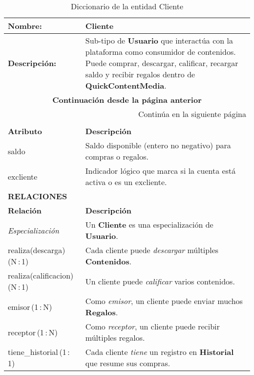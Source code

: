 \renewcommand{\arraystretch}{1.3}
\begin{longtable}{|p{3.5cm}|p{10cm}|}
\caption{Diccionario de la entidad Cliente}
\label{tab:diccionarioCliente} \\ 
\hline
\textbf{Nombre:} & Cliente \\
\hline
\textbf{Descripción:} & 
Sub-tipo de \textbf{Usuario} que interactúa con la plataforma como
consumidor de contenidos.  Puede comprar, descargar, calificar,
recargar saldo y recibir regalos dentro de
\textbf{QuickContentMedia}. \\ \hline
\endfirsthead

\multicolumn{2}{c}{\textbf{Continuación desde la página anterior}} \\ 
\endhead

\hline \multicolumn{2}{r}{{Continúa en la siguiente página}} \\ 
\endfoot

\hline
\endlastfoot

\multicolumn{2}{|p{13.5cm}|}{\textbf{ATRIBUTOS}} \\ \hline
\textbf{Atributo} & \textbf{Descripción} \\ \hline
saldo       & Saldo disponible (entero no negativo) para compras o regalos. \\ \hline
excliente   & Indicador lógico que marca si la cuenta está activa o es un excliente. \\ \hline

\multicolumn{2}{|p{13.5cm}|}{\textbf{RELACIONES}} \\ \hline
\textbf{Relación} & \textbf{Descripción} \\ \hline
\textit{Especialización} & Un \textbf{Cliente} es una especialización de \textbf{Usuario}. \\ \hline
realiza(descarga)\,(N\,:\,1) & Cada cliente puede \emph{descargar} múltiples \textbf{Contenidos}. \\ \hline
realiza(calificacion)\,(N\,:\,1) & Un cliente puede \emph{calificar} varios contenidos. \\ \hline
emisor\,(1\,:\,N) & Como \textit{emisor}, un cliente puede enviar muchos \textbf{Regalos}. \\ \hline
receptor\,(1\,:\,N) & Como \textit{receptor}, un cliente puede recibir múltiples regalos. \\ \hline
tiene\_historial\,(1\,:\,1) & Cada cliente \emph{tiene} un registro en \textbf{Historial} que resume sus compras.\\ \hline
\end{longtable}